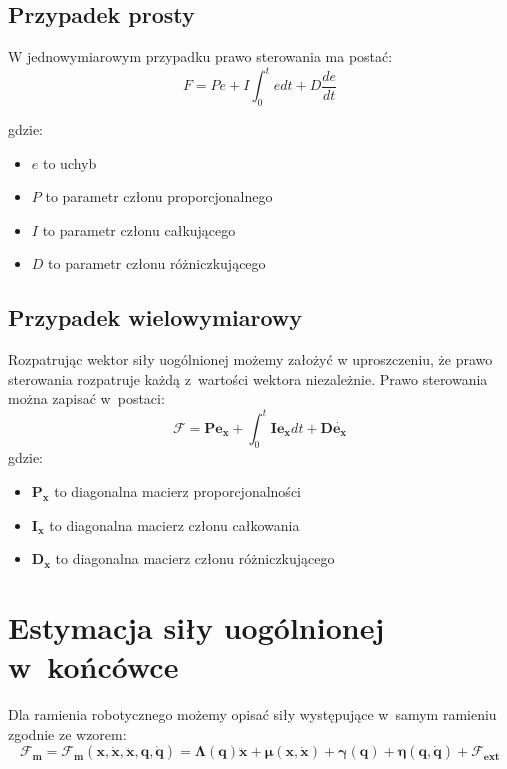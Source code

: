\subsection{Przypadek prosty}
W jednowymiarowym przypadku prawo sterowania ma postać:
\begin{equation}
F = Pe + I\int_{0}^{t}e dt + D\frac{de}{dt}
\end{equation}

gdzie:
\begin{itemize}
	\item $e$ to uchyb
	\item $P$ to parametr członu proporcjonalnego
	\item $I$ to parametr członu całkującego
	\item $D$ to parametr członu różniczkującego
\end{itemize}


\subsection{Przypadek wielowymiarowy}
Rozpatrując wektor siły uogólnionej możemy założyć w uproszczeniu, że prawo sterowania rozpatruje każdą z~wartości wektora niezależnie. Prawo sterowania można zapisać w~postaci:
\begin{equation}
\boldsymbol{\mathcal{F}} = \boldsymbol{P}\boldsymbol{e_x} +\int_{0}^{t}  \boldsymbol{I}\boldsymbol{e_x}dt + \boldsymbol{D}\dot{\boldsymbol{e_x}}
\end{equation}
gdzie:
\begin{itemize}
	\item $\boldsymbol{P_x}$ to diagonalna macierz proporcjonalności
	\item $\boldsymbol{I_x}$ to diagonalna macierz członu całkowania
	\item $\boldsymbol{D_x}$ to diagonalna macierz członu różniczkującego
\end{itemize}

\section{Estymacja siły uogólnionej w~końcówce}
\label{chap:estymacja}
Dla ramienia robotycznego możemy opisać siły występujące w~samym ramieniu zgodnie ze wzorem:
\begin{equation}
\boldsymbol{\mathcal{F}_m} = \boldsymbol{\mathcal{F}_m}(\boldsymbol{x}, \dot{\boldsymbol{x}}, \ddot{\boldsymbol{x}}, \boldsymbol{q}, \dot{\boldsymbol{q}}) = \boldsymbol{\Lambda}(\boldsymbol{q})\boldsymbol{\ddot{x}} + \boldsymbol{\mu}(\boldsymbol{x}, \boldsymbol{\dot{x}}) + \boldsymbol{\gamma}(\boldsymbol{q}) + \boldsymbol{\eta}(\boldsymbol{q}, \boldsymbol{\dot{q}}) + \boldsymbol{\mathcal{F}_{ext}}
\label{eq:ramie}
\end{equation}

